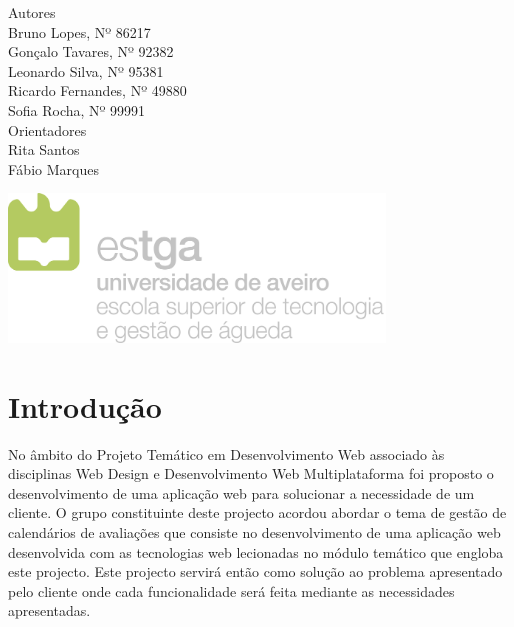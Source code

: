 \documentclass[11pt, twoside]{report}
\begin{document}
\begin{titlepage}
		
		
		\large
		Autores\\
		Bruno Lopes, Nº 86217 \\
		Gonçalo Tavares, Nº 92382  \\
		Leonardo Silva, Nº 95381 \\
		Ricardo Fernandes, Nº 49880  \\
		Sofia Rocha, Nº 99991 \\
		
		\vspace{1cm}
		Orientadores\\
		Rita Santos \\
		Fábio Marques\\
		\vspace{4cm}
		
		\centering
		\includegraphics[width=10cm]{image/AssB_vertical_cor}
		
	\end{titlepage}

	\newpage
	\setcounter{page}{1} %
	\tableofcontents %
	\thispagestyle{plain} %
	\thispagestyle{empty} %
	\newpage
	\listoftables %
	\newpage
	\listoffigures %
	
	\newpage
	\thispagestyle{plain}%
	\thispagestyle{empty}%
	
	
	\printnomenclature
	
	\newpage
	
	
	\chapter{Introdução}
	
	No âmbito do Projeto Temático em Desenvolvimento Web associado às disciplinas Web Design e Desenvolvimento Web Multiplataforma foi proposto o desenvolvimento de uma aplicação web para solucionar a necessidade de um cliente. 
	O grupo constituinte deste projecto acordou abordar o tema de gestão de calendários de avaliações que consiste no desenvolvimento de uma aplicação web desenvolvida com as tecnologias web lecionadas no módulo temático que engloba este projecto.
	Este projecto servirá então como solução ao problema apresentado pelo cliente onde cada funcionalidade será feita mediante as necessidades apresentadas.
	
\end{document}
